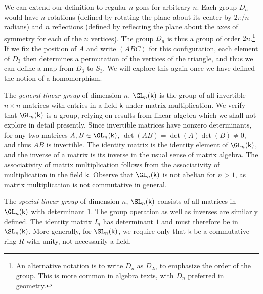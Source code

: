 \begin{example}
    We can extend our definition to regular \(n\)-gons for arbitrary \(n\). Each
    group \(D_n\) would have \(n\) rotations (defined by rotating the plane
    about its center by \(2\pi/n\) radians) and \(n\) reflections (defined by
    reflecting the plane about the axes of symmetry for each of the \(n\)
    vertices). The group \(D_n\) is thus a group of order \(2n\).\footnote{An
    alternative notation is to write \(D_n\) as \(D_{2n}\) to emphasize the
    order of the group. This is more common in algebra texts, with \(D_n\)
    preferred in geometry.} If we fix the position of \(A\) and write \((ABC)\)
    for this configuration, each element of \(D_3\) then determines a
    permutation of the vertices of the triangle, and thus we can define a map
    from \(D_3\) to \(S_3\). We will explore this again once we have defined the
    notion of a homomorphism.
\end{example}

\begin{example}
    \label{ex:linear-groups}
    The \emph{general linear group} of dimension \(n\), \(\GL_n(\mathsf{k})\) is
    the group of all invertible \(n \times n\) matrices with entries in a field
    \(\mathsf{k}\) under matrix multiplication. We verify that
    \(\GL_n(\mathsf{k})\) is a group, relying on results from linear algebra
    which we shall not explore in detail presently. Since invertible matrices
    have nonzero determinants, for any two matrices \(A, B \in
    \GL_n(\mathsf{k})\), \(\det(AB) = \det(A)\det(B) \neq 0\), and thus \(AB\)
    is invertible. The identity matrix is the identity element of
    \(\GL_n(\mathsf{k})\), and the inverse of a matrix is its inverse in the
    usual sense of matrix algebra. The associativity of matrix multiplication
    follows from the associativity of multiplication in the field
    \(\mathsf{k}\). Observe that \(\GL_n(\mathsf{k})\) is not abelian for \(n >
    1\), as matrix multiplication is not commutative in general.

    The \emph{special linear group} of dimension \(n\), \(\SL_n(\mathsf{k})\)
    consists of all matrices in \(\GL_n(\mathsf{k})\) with determinant \(1\).
    The group operation as well as inverses are similarly defined. The identity
    matrix \(I_n\) has determinant \(1\) and must therefore be in
    \(\SL_n(\mathsf{k})\). More generally, for \(\SL_n(\mathsf{k})\), we require
    only that \(\mathsf{k}\) be a commutative ring \(R\) with unity, not
    necessarily a field.
\end{example}

